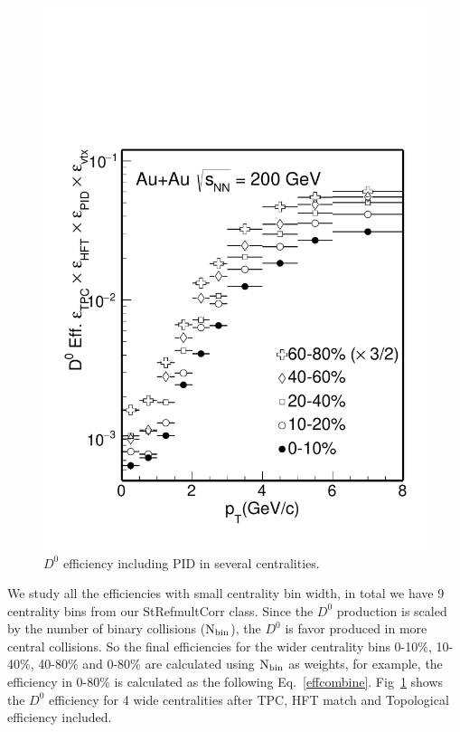 \begin{figure}[htbp]
\begin{minipage}[htbp]{0.52\linewidth}
\includegraphics[width=1.0\textwidth,angle=0]{figure/Run14_D0HFT/Datad0Eff.pdf} 
\caption{ $D^0$ efficiency including PID in several centralities. \label{D0effCombine}}
\end{minipage}
\end{figure}

We study all the efficiencies with small centrality bin width, in total we have 9 centrality bins from our StRefmultCorr class. Since the $D^0$ production is scaled by the number of binary collisions ($\textup{N}_{\textup{bin}}$), the $D^0$ is favor produced in more central collisions. So the final efficiencies for the wider centrality bins 0-10\%, 10-40\%, 40-80\% and 0-80\% are calculated using $\textup{N}_{\textup{bin}}$ as weights, for example, the efficiency in 0-80\% is calculated as the following Eq.~\ref{effcombine}. Fig~\ref{D0effCombine} shows the $D^0$ efficiency for 4 wide centralities after TPC, HFT match and Topological efficiency included.

